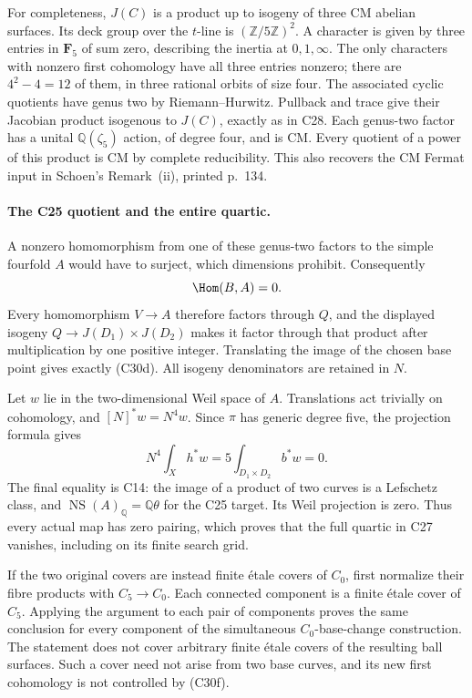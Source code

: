\documentclass[11pt]{article}
\newcommand{\Q}{\mathbb Q}\newcommand{\C}{\mathbb C}\newcommand{\Z}{\mathbb Z}\newcommand{\R}{\mathbb R}\newcommand{\A}{\mathbb A}\newcommand{\OO}{\mathcal O}
\theoremstyle{definition}\newtheorem{definition}[theorem]{Definition}\newtheorem{remark}[theorem]{Remark}
\begin{document}
For completeness, $J(C)$ is a product up to isogeny
of three CM abelian surfaces.  Its deck group over
the $t$-line is $(\Z/5\Z)^2$.  A character is given
by three entries in $\mathbf F_5$ of sum zero,
describing the inertia at $0,1,\infty$.  The only
characters with nonzero first cohomology have all
three entries nonzero; there are $4^2-4=12$ of them,
in three rational orbits of size four.  The associated
cyclic quotients have genus two by
Riemann--Hurwitz.  Pullback and trace give their
Jacobian product isogenous to $J(C)$, exactly as in
C28.  Each genus-two factor has a unital
$\Q(\zeta_5)$ action, of degree four, and is CM.
Every quotient of a power of this product is CM by
complete reducibility.  This also recovers the CM
Fermat input in Schoen's Remark~(ii), printed p.~134.

\paragraph{The C25 quotient and the entire quartic.}
A nonzero homomorphism from one of these genus-two
factors to the simple fourfold $A$ would have to
surject, which dimensions prohibit.  Consequently
\[
                         \Hom(B,A)=0.
\]
Every homomorphism $V\to A$ therefore factors through
$Q$, and the displayed isogeny $Q\to J(D_1)\times
J(D_2)$ makes it factor through that product after
multiplication by one positive integer.  Translating
the image of the chosen base point gives exactly
(C30d).  All isogeny denominators are retained in $N$.

Let $w$ lie in the two-dimensional Weil space of $A$.
Translations act trivially on cohomology, and
$[N]^*w=N^4w$.  Since $\pi$ has generic degree five,
the projection formula gives
\[
 N^4\int_X h^*w
       =5\int_{D_1\times D_2}b^*w=0.
                                                        \tag{C30m}
\]
The final equality is C14: the image of a product
of two curves is a Lefschetz class, and
$\operatorname{NS}(A)_\Q=\Q\theta$ for the C25
target.  Its Weil projection is zero.  Thus every
actual map has zero pairing, which proves that the
full quartic in C27 vanishes, including on its finite
search grid.

If the two original covers are instead finite
\'etale covers of $C_0$, first normalize their fibre
products with $C_5\to C_0$.  Each connected component
is a finite \'etale cover of $C_5$.  Applying the
argument to each pair of components proves the same
conclusion for every component of the simultaneous
$C_0$-base-change construction.  The statement does
not cover arbitrary finite \'etale covers of the
resulting ball surfaces.  Such a cover need not
arise from two base curves, and its new first
cohomology is not controlled by (C30f).
\end{document}
